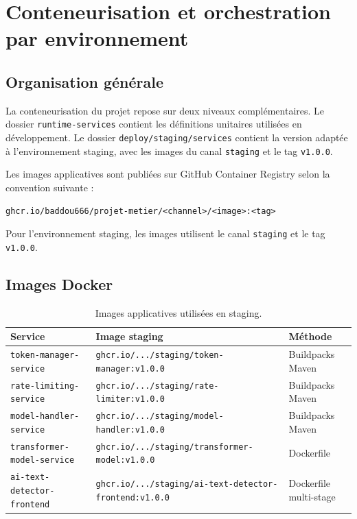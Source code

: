 ﻿\documentclass[12pt, a4paper]{report}
\begin{document}
\chapter{Conteneurisation et orchestration par environnement}

\section{Organisation générale}

La conteneurisation du projet repose sur deux niveaux complémentaires. Le dossier
\texttt{runtime-services} contient les définitions unitaires utilisées en
développement. Le dossier \texttt{deploy/staging/services} contient la version
adaptée à l'environnement staging, avec les images du canal \texttt{staging} et
le tag \texttt{v1.0.0}.

Les images applicatives sont publiées sur GitHub Container Registry selon la
convention suivante :

\begin{verbatim}
ghcr.io/baddou666/projet-metier/<channel>/<image>:<tag>
\end{verbatim}

Pour l'environnement staging, les images utilisent le canal
\texttt{staging} et le tag \texttt{v1.0.0}.

\section{Images Docker}

\begin{table}[H]
\centering
\small
\renewcommand{\arraystretch}{1.45}
\begin{tabular}{p{}p{}p{}}
\toprule
\textbf{Service} & \textbf{Image staging} & \textbf{Méthode} \\
\midrule
\texttt{token-manager}\newline\texttt{-service} & \texttt{ghcr.io/.../staging/token-manager:v1.0.0} & Buildpacks Maven \\
\texttt{rate-limiting}\newline\texttt{-service} & \texttt{ghcr.io/.../staging/rate-limiter:v1.0.0} & Buildpacks Maven \\
\texttt{model-handler}\newline\texttt{-service} & \texttt{ghcr.io/.../staging/model-handler:v1.0.0} & Buildpacks Maven \\
\texttt{transformer-model}\newline\texttt{-service} & \texttt{ghcr.io/.../staging/transformer-model:v1.0.0} & Dockerfile \\
\texttt{ai-text-detector}\newline\texttt{-frontend} & \texttt{ghcr.io/.../staging/ai-text-detector-frontend:v1.0.0} & Dockerfile multi-stage \\
\bottomrule
\end{tabular}
\caption{Images applicatives utilisées en staging.}
\label{tab:images-staging}
\end{table}
\end{document}
